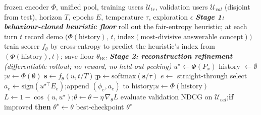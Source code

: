 \documentclass[11pt]{article}
\begin{document}
\begin{algorithm}[h]
\caption{CASPER policy training: heuristic-distilled floor $\to$ self-supervised reconstruction refinement}\label{alg:train}
\begin{algorithmic}[1]
\Require frozen encoder $\Phi$, unified pool, training users $\mathcal{U}_{tr}$, validation users $\mathcal{U}_{val}$ (disjoint from test), horizon $T$, epochs $E$, temperature $\tau$, exploration $\epsilon$
\Statex \emph{\textbf{Stage 1: behaviour-cloned heuristic floor}}
  \State roll out the fair-entropy heuristic; at each turn $t$ record demo $\big(\Phi(\text{history}),\,t,\,\mathrm{index}(\text{most-divisive answerable concept})\big)$
\EndFor
\State train scorer $f_\theta$ by cross-entropy to predict the heuristic's index from $(\Phi(\text{history}),t)$; save floor $\theta_{\mathrm{BC}}$ 
\Statex \emph{\textbf{Stage 2: reconstruction refinement} (differentiable rollout; no reward, no held-out peeking)}
    \State $u^\star\gets\Phi(P_x)$ 
    \State history $\gets\emptyset$;\quad $u\gets\Phi(\emptyset)$
      \State $\mathbf{s}\gets f_\theta(u,t/T)$;\quad $\mathbf{p}\gets\mathrm{softmax}(\mathbf{s}/\tau)$
      \State $e\gets$ straight-through select 
      \State $a_e\gets\mathrm{sign}(u^{\star\top}E_e)$;\quad append $(\phi_e,a_e)$ to history;\quad $u\gets\Phi(\text{history})$ 
    \EndFor
    \State $L\gets 1-\cos(u,u^\star)$;\quad $\theta\gets\theta-\eta\,\nabla_\theta L$ 
  \EndFor
  \State evaluate validation NDCG on $\mathcal{U}_{val}$;\quad \textbf{if} improved \textbf{then} $\theta^\star\gets\theta$ 
\EndFor
\State \Return best-checkpoint $\theta^\star$
\end{algorithmic}
\end{algorithm}
\end{document}
